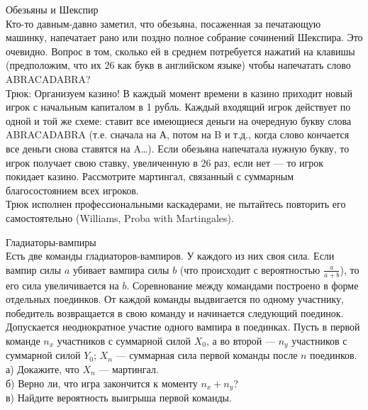 \begin{solution}
\begin{solution}
\begin{solution}
\begin{solution}
\begin{solution}
\begin{solution}
\begin{solution}
\begin{solution}
\begin{solution}
{\begin{problem}
 Обезьяны и Шекспир \\
Кто-то давным-давно заметил, что обезьяна, посаженная за
печатающую машинку, напечатает рано или поздно полное собрание
сочинений Шекспира. Это очевидно. Вопрос в том, сколько ей в
среднем потребуется нажатий на клавишы (предположим, что их 26 как
букв в
английском языке) чтобы напечатать слово ABRACADABRA? \\
Трюк: Организуем казино! В каждый момент времени в казино приходит
новый игрок с начальным капиталом в 1 рубль. Каждый входящий игрок
действует по одной и той же схеме: ставит все имеющиеся деньги на
очередную букву слова ABRACADABRA (т.е. сначала на А, потом на B и
т.д., когда слово кончается все деньги снова ставятся на A\ldots).
Если обезьяна напечатала нужную букву, то игрок получает свою
ставку, увеличенную в 26 раз, если нет --- то игрок покидает казино.
Рассмотрите мартингал, связанный с суммарным благосостоянием всех
игроков. \\
Трюк исполнен профессиональными каскадерами, не пытайтесь
повторить его самостоятельно (Williams, Proba with Martingales). 
\end{problem} 
\begin{solution} 

\end{solution}

\begin{problem}
 Гладиаторы-вампиры \\
Есть две команды гладиаторов-вампиров. У каждого из них своя сила.
Если вампир силы $a$ убивает вампира силы $b$ (что происходит с
вероятностью $\frac{a}{a+b}$), то его сила увеличивается на $b$.
Соревнование между командами построено в форме отдельных
поединков. От каждой команды выдвигается по одному участнику,
победитель возвращается в свою команду и начинается следующий
поединок. Допускается неоднократное участие одного вампира в
поединках. Пусть в первой команде $n_{x}$ участников с суммарной
силой $X_{0}$, а во второй --- $n_{y}$ участников с суммарной силой
$Y_{0}$; $X_{n}$ --- суммарная сила первой команды после $n$
поединков. \\
а) Докажите, что $X_{n}$ --- мартингал. \\
б) Верно ли, что игра закончится к моменту $n_{x}+n_{y}$? \\
в) Найдите вероятность выигрыша первой команды. 
\end{problem} 
\begin{solution} 


\end{solution}}
\end{solution}
\end{solution}
\end{solution}
\end{solution}
\end{solution}
\end{solution}
\end{solution}
\end{solution}
\end{solution}
